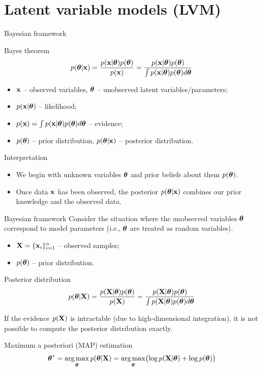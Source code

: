 \documentclass{beamer}
\begin{document}
\section{Latent variable models (LVM)}
\begin{frame}{Bayesian framework}
	\begin{block}{Bayes theorem}
		\vspace{-0.3cm}
		\[
			p(\boldsymbol{\theta}| \mathbf{x}) = \frac{p(\mathbf{x} | \boldsymbol{\theta}) p(\boldsymbol{\theta})}{p(\mathbf{x})} = \frac{p(\mathbf{x} | \boldsymbol{\theta}) p(\boldsymbol{\theta})}{\int p(\mathbf{x} | \boldsymbol{\theta}) p(\boldsymbol{\theta}) d \boldsymbol{\theta}} 
		\]
		\vspace{-0.3cm}
		\begin{itemize}
			\item $\mathbf{x}$ -- observed variables, $\boldsymbol{\theta}$ -- unobserved latent variables/parameters;
			\item $p(\mathbf{x} | \boldsymbol{\theta})$ -- likelihood;
			\item $p(\mathbf{x}) = \int p(\mathbf{x} | \boldsymbol{\theta}) p(\boldsymbol{\theta}) d \boldsymbol{\theta}$ -- evidence;
			\item $p(\boldsymbol{\theta})$ -- prior distribution, $p(\boldsymbol{\theta}| \mathbf{x})$ -- posterior distribution.
		\end{itemize}
	\end{block}
	\begin{block}{Interpretation}
		\begin{itemize}
			\item We begin with unknown variables $\boldsymbol{\theta}$ and prior beliefs about them $p(\boldsymbol{\theta})$.
			\item Once data $\mathbf{x}$ has been observed, the posterior $p(\boldsymbol{\theta}| \mathbf{x})$ combines our prior knowledge and the observed data.
		\end{itemize} 
	\end{block}
\end{frame}
\begin{frame}{Bayesian framework}
	Consider the situation where the unobserved variables $\boldsymbol{\theta}$ correspond to model parameters (i.e., $\boldsymbol{\theta}$ are treated as random variables).
	\begin{itemize}
		\item $\mathbf{X} = \{\mathbf{x}_i\}_{i=1}^n$ -- observed samples;
		\item $p(\boldsymbol{\theta})$ -- prior distribution.
	\end{itemize}
	\begin{block}{Posterior distribution}
		\[
			p(\boldsymbol{\theta} | \mathbf{X}) = \frac{p(\mathbf{X} | \boldsymbol{\theta}) p(\boldsymbol{\theta})}{p(\mathbf{X})} = \frac{p(\mathbf{X} | \boldsymbol{\theta}) p(\boldsymbol{\theta})}{\int p(\mathbf{X} | \boldsymbol{\theta}) p(\boldsymbol{\theta}) d \boldsymbol{\theta}} 
		\]
		\vspace{-0.2cm}
	\end{block}
	If the evidence $p(\mathbf{X})$ is intractable (due to high-dimensional integration), it is not possible to compute the posterior distribution exactly.
    \begin{block}{Maximum a posteriori (MAP) estimation}
	    \vspace{-0.2cm}
	    \[
	        \boldsymbol{\theta}^* = \operatorname*{arg\,max}_{\boldsymbol{\theta}} p(\boldsymbol{\theta} | \mathbf{X}) = \operatorname*{arg\,max}_{\boldsymbol{\theta}} \bigl(\log p(\mathbf{X} | \boldsymbol{\theta}) + \log p(\boldsymbol{\theta}) \bigr)
	    \]
    \end{block}
\end{frame}
\end{document}
